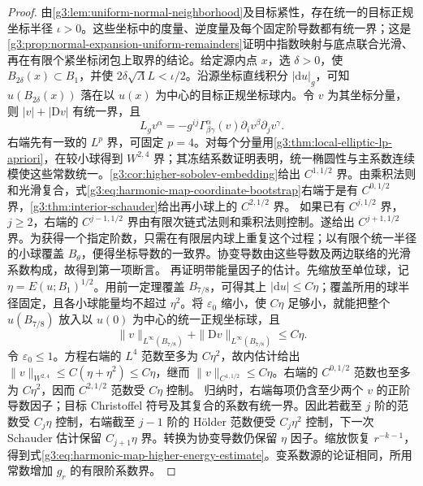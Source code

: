 \begin{proof}
	由\cref{g3:lem:uniform-normal-neighborhood}及目标紧性，存在统一的目标正规坐标半径 \(\iota>0\)。这些坐标中的度量、逆度量及每个固定阶导数都有统一界；这是\cref{g3:prop:normal-expansion-uniform-remainders}证明中指数映射与底点联合光滑、再在有限个紧坐标闭包上取界的结论。给定源内点 \(x\)，选 \(\delta>0\)，使 \(B_{2\delta}(x)\subset B_1\)，并使 \(2\delta\sqrt\Lambda L<\iota/2\)。沿源坐标直线积分 \(|\mathrm du|_g\)，可知 \(u(B_{2\delta}(x))\) 落在以 \(u(x)\) 为中心的目标正规坐标球内。令 \(v\) 为其坐标分量，则 \(|v|+|\mathrm Dv|\) 有统一界，且
	\begin{equation}\label{g3:eq:harmonic-map-coordinate-bootstrap}
		L_gv^\alpha=-g^{ij}\Gamma^\alpha_{\beta\gamma}(v)
		\partial_iv^\beta\partial_jv^\gamma.
	\end{equation}
	右端先有一致的 \(L^p\) 界，可固定 \(p=4\)。对每个分量用\cref{g3:thm:local-elliptic-lp-apriori}，在较小球得到 \(W^{2,4}\) 界；其冻结系数证明表明，统一椭圆性与主系数连续模使这些常数统一。\cref{g3:cor:higher-sobolev-embedding}给出 \(C^{1,1/2}\) 界。由乘积法则和光滑复合，式\eqref{g3:eq:harmonic-map-coordinate-bootstrap}右端于是有 \(C^{0,1/2}\) 界，\cref{g3:thm:interior-schauder}给出再小球上的 \(C^{2,1/2}\) 界。
	如果已有 \(C^{j,1/2}\) 界，\(j\ge2\)，右端的 \(C^{j-1,1/2}\) 界由有限次链式法则和乘积法则控制。遂给出 \(C^{j+1,1/2}\) 界。为获得一个指定阶数，只需在有限层内球上重复这个过程；以有限个统一半径的小球覆盖 \(B_\theta\)，便得坐标导数的一致界。协变导数由这些导数及两边联络的光滑系数构成，故得到第一项断言。
	再证明带能量因子的估计。先缩放至单位球，记 \(\eta=E(u;B_1)^{1/2}\)。用前一定理覆盖 \(B_{7/8}\)，可得其上 \(|\mathrm du|\le C\eta\)；覆盖所用的球半径固定，且各小球能量均不超过 \(\eta^2\)。将 \(\varepsilon_0\) 缩小，使 \(C\eta\) 足够小，就能把整个 \(u(B_{7/8})\) 放入以 \(u(0)\) 为中心的统一正规坐标球，且
	\[
		\|v\|_{L^\infty(B_{7/8})}+\|\mathrm Dv\|_{L^\infty(B_{7/8})}\le C\eta.
	\]
	令 \(\varepsilon_0\le1\)。方程右端的 \(L^4\) 范数至多为 \(C\eta^2\)，故内估计给出 \(\|v\|_{W^{2,4}}\le C(\eta+\eta^2)\le C\eta\)，继而 \(\|v\|_{C^{1,1/2}}\le C\eta\)。右端的 \(C^{0,1/2}\) 范数也至多为 \(C\eta^2\)，因而 \(C^{2,1/2}\) 范数受 \(C\eta\) 控制。
	归纳时，右端每项仍含至少两个 \(v\) 的正阶导数因子；目标 Christoffel 符号及其复合的系数有统一界。因此若截至 \(j\) 阶的范数受 \(C_j\eta\) 控制，右端截至 \(j-1\) 阶的 Hölder 范数便受 \(C_j\eta^2\) 控制，下一次 Schauder 估计保留 \(C_{j+1}\eta\) 界。转换为协变导数仍保留 \(\eta\) 因子。缩放恢复 \(r^{-k-1}\)，得到式\eqref{g3:eq:harmonic-map-higher-energy-estimate}。变系数源的论证相同，所用常数增加 \(g_r\) 的有限阶系数界。
\end{proof}

